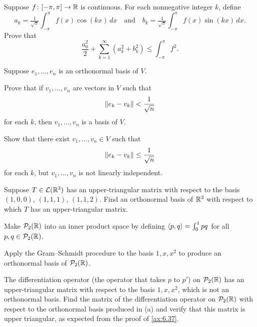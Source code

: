 \begin{exc}
\begin{exercise}
Suppose $f\colon[-\pi,\pi]\to\mathbb{R}$ is continuous. For each nonnegative integer
$k$, define
\[ a_k = \tfrac{1}{\sqrt\pi}\int_{-\pi}^{\pi} f(x)\cos(kx)\,dx
   \quad\text{and}\quad
   b_k = \tfrac{1}{\sqrt\pi}\int_{-\pi}^{\pi} f(x)\sin(kx)\,dx. \]
Prove that
\[ \frac{a_0^2}{2}+\sum_{k=1}^{\infty}(a_k^2+b_k^2) \le \int_{-\pi}^{\pi} f^2. \]
\end{exercise}

\begin{exercise}
Suppose $e_1,\dots,e_n$ is an orthonormal basis of $V$.
\begin{parts}
\item Prove that if $v_1,\dots,v_n$ are vectors in $V$ such that
  \[ \lVert e_k-v_k \rVert < \frac{1}{\sqrt n} \]
  for each $k$, then $v_1,\dots,v_n$ is a basis of $V$.
\item Show that there exist $v_1,\dots,v_n\in V$ such that
  \[ \lVert e_k-v_k \rVert \le \frac{1}{\sqrt n} \]
  for each $k$, but $v_1,\dots,v_n$ is not linearly independent.
\end{parts}
\end{exercise}

\begin{exercise}
Suppose $T\in\mathcal{L}(\mathbb{R}^3)$ has an upper-triangular matrix with respect to the
basis $(1,0,0)$, $(1,1,1)$, $(1,1,2)$. Find an orthonormal basis of $\mathbb{R}^3$ with
respect to which $T$ has an upper-triangular matrix.
\end{exercise}

\begin{exercise}
Make $\mathcal{P}_2(\mathbb{R})$ into an inner product space by defining
$\langle p, q \rangle=\int_0^1 pq$ for all $p,q\in\mathcal{P}_2(\mathbb{R})$.
\begin{parts}
\item Apply the Gram--Schmidt procedure to the basis $1,x,x^2$ to produce an
  orthonormal basis of $\mathcal{P}_2(\mathbb{R})$.
\item The differentiation operator (the operator that takes $p$ to $p'$) on
  $\mathcal{P}_2(\mathbb{R})$ has an upper-triangular matrix with respect to the basis
  $1,x,x^2$, which is not an orthonormal basis. Find the matrix of the
  differentiation operator on $\mathcal{P}_2(\mathbb{R})$ with respect to the orthonormal
  basis produced in (a) and verify that this matrix is upper triangular, as
  expected from the proof of \ref{ax:6.37}.
\end{parts}
\end{exercise}


\end{exc}
